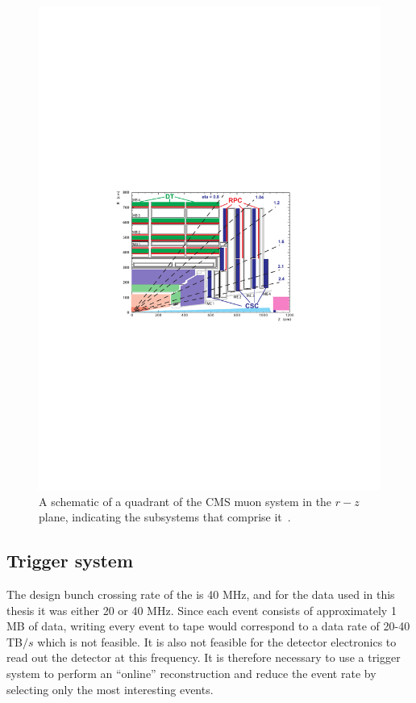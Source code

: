 \begin{figure}
  \includegraphics[width=1.2\largefigwidth]{plots/detector/muon_layout.pdf}
  \caption[A schematic of a quadrant of the CMS muon system in the $r-z$ plane, indicating the subsystems that comprise it.]{A schematic of a quadrant of the CMS muon system in the $r-z$ plane, indicating the subsystems that comprise it~\cite{Bayatian:922757}.}
  \label{fig:muonschematic}
\end{figure}

\subsection{Trigger system}
\label{sec:triggers}
The design bunch crossing rate of the \LHC is 40 MHz, and for the data used in this thesis it was either 20 or 40 MHz. Since each event consists of approximately 1 MB of data, writing every event to tape would correspond to a data rate of 20-40 TB$/s$ which is not feasible. It is also not feasible for the detector electronics to read out the detector at this frequency. It is therefore necessary to use a trigger system to perform an ``online'' reconstruction and reduce the event rate by selecting only the most interesting events.

